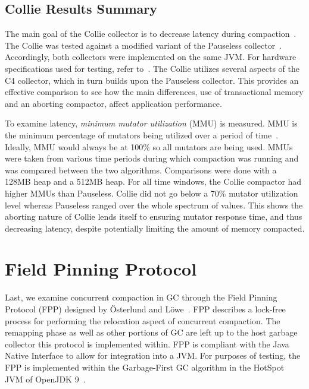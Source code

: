 \documentclass{sig-alternate}
\begin{document}
\subsection{Collie Results Summary}
\label{sec:collieResults}


The main goal of the Collie collector is to decrease latency
during compaction~\cite{Iyengar:Collie}. The Collie was tested 
against a modified variant of the Pauseless collector~\cite{Click:Pauseless}.
Accordingly, both collectors were implemented on the same JVM. For hardware
specifications used for testing, refer to~\cite{Iyengar:Collie}. The Collie
utilizes several aspects of the C4 collector, which in turn builds upon the Pauseless
collector. This provides an effective comparison to see how the main differences, 
use of transactional memory and an aborting compactor, affect application performance. 

To examine latency, \emph{minimum mutator utilization} (MMU) is measured.
MMU is the minimum percentage of mutators being utilized over a period of time~\cite{Bacon:MMU}. Ideally,
MMU would always be at 100\% so all mutators are being used. 
MMUs were taken from various time periods during which
compaction was running and was compared between the two algorithms. Comparisons were done
with a 128MB heap and a 512MB heap. For all time windows, the Collie compactor
had higher MMUs than Pauseless. Collie did not go below a 70\% mutator utilization 
level whereas Pauseless ranged over the whole spectrum of values. 
This shows the aborting nature of Collie
lends itself to ensuring mutator response time, and thus decreasing latency, 
despite potentially limiting the amount of memory compacted.


\section{Field Pinning Protocol}
\label{sec:fpp}

Last, we examine concurrent compaction in GC through the Field Pinning
Protocol (FPP) designed by \"{O}sterlund and L\"{o}we~\cite{Osterlund:FPP}.
FPP describes a lock-free process for performing the relocation aspect
of concurrent compaction. The remapping phase as well as other portions
of GC are left up to the host garbage collector this
protocol is implemented within. FPP is compliant with the Java Native Interface
to allow for integration into a JVM. For purposes of testing, the FPP 
is implemented within the Garbage-First GC algorithm in the HotSpot JVM 
of OpenJDK 9~\cite{Detlefs:G1}.
\end{document}

